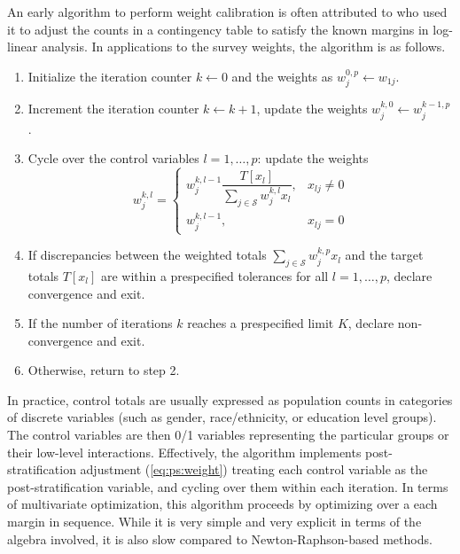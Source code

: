 An early algorithm to perform weight calibration is often attributed to
\citet{deming:stephan:1940} who used it to adjust the counts in a contingency
table to satisfy the known margins in log-linear analysis.
In applications to the survey weights, the algorithm is as follows.
\begin{enumerate}
    \item Initialize the iteration counter $k\leftarrow 0$
          and the weights as $w_j^{0,p} \leftarrow w_{1j}$.
    \item Increment the iteration counter $k \leftarrow k+1$,
          update the weights $w_j^{k,0} \leftarrow w_j^{k-1,p}$.
    \item Cycle over the control variables $l=1,\ldots,p$: update the weights
          $$
            w_j^{k,l} =
                \left\{
                \begin{array}{ll}
                    w_j^{k,l-1} \dfrac{ T[x_l] }{ \sum_{j \in \mathcal{S}} w_j^{k,l} x_l },
                        & x_{lj} \neq 0 \\
                    w_j^{k,l-1},
                        & x_{lj} = 0
                \end{array}
                \right.
          $$
    \item If discrepancies between the weighted totals $\sum_{j \in \mathcal{S}} w_j^{k,p} x_l$
          and the target totals $T[x_l]$ are within a prespecified tolerances for all
          $l=1,\ldots,p$, declare convergence and exit.
    \item If the number of iterations $k$ reaches a prespecified limit $K$,
          declare non-convergence and exit.
    \item Otherwise, return to step 2.
\end{enumerate}
In practice, control totals are usually expressed as population counts in
categories of discrete variables (such as gender, race/ethnicity, or education level groups).
The control variables are then 0/1 variables representing the particular groups
or their low-level interactions.
Effectively, the algorithm implements post-stratification adjustment
(\ref{eq:ps:weight}) treating each control variable as the post-stratification
variable, and cycling over them within each iteration. In terms of multivariate optimization,
this algorithm proceeds by optimizing over a each margin in sequence.
While it is very simple and very explicit in terms
of the algebra involved, it is also slow compared to Newton-Raphson-based methods.

